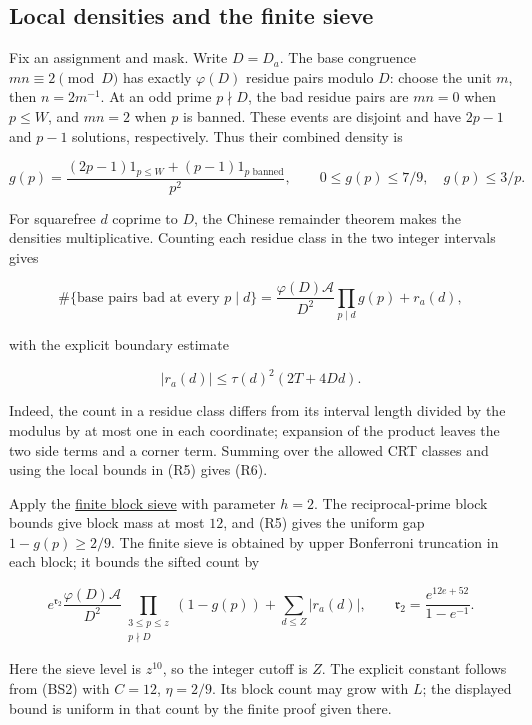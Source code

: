 
\hypertarget{rectangles-local-densities-and-the-finite-sieve}{%
\subsection{Local densities and the finite
sieve}\label{rectangles-local-densities-and-the-finite-sieve}}

Fix an assignment and mask. Write \(D=D_a\). The base congruence
\(mn\equiv2\pmod D\) has exactly \(\varphi(D)\) residue pairs modulo
\(D\): choose the unit \(m\), then \(n=2m^{-1}\). At an odd prime
\(p\nmid D\), the bad residue pairs are \(mn=0\) when \(p\le W\), and
\(mn=2\) when \(p\) is banned. These events are disjoint and have
\(2p-1\) and \(p-1\) solutions, respectively. Thus their combined
density is

\[
g(p)=\frac{(2p-1)1_{p\le W}+(p-1)1_{p\text{ banned}}}{p^2},
\qquad 0\le g(p)\le7/9,\quad g(p)\le3/p. \tag{R5}
\]

For squarefree \(d\) coprime to \(D\), the Chinese remainder theorem
makes the densities multiplicative. Counting each residue class in the
two integer intervals gives

\[
\#\{\text{base pairs bad at every }p\mid d\}
=\frac{\varphi(D)\mathcal A}{D^2}\prod_{p\mid d}g(p)+r_a(d),
\]

with the explicit boundary estimate

\[
|r_a(d)|\le\tau(d)^2(2T+4Dd). \tag{R6}
\]

Indeed, the count in a residue class differs from its interval length
divided by the modulus by at most one in each coordinate; expansion of
the product leaves the two side terms and a corner term. Summing over
the allowed CRT classes and using the local bounds in (R5) gives (R6).

Apply the \protect\hyperlink{block-sieve}{finite block sieve} with
parameter \(h=2\). The reciprocal-prime block bounds give block mass at
most \(12\), and (R5) gives the uniform gap \(1-g(p)\ge2/9\). The finite
sieve is obtained by upper Bonferroni truncation in each block; it
bounds the sifted count by

\[
e^{\mathfrak r_2}\frac{\varphi(D)\mathcal A}{D^2}
 \prod_{\substack{3\le p\le z\\p\nmid D}}(1-g(p))
+\sum_{d\le Z}|r_a(d)|,
\qquad
\mathfrak r_2=\frac{e^{12e+52}}{1-e^{-1}}. \tag{R7}
\]

Here the sieve level is \(z^{10}\), so the integer cutoff is \(Z\). The
explicit constant follows from (BS2) with \(C=12\), \(\eta=2/9\). Its
block count may grow with \(L\); the displayed bound is uniform in that
count by the finite proof given there.

